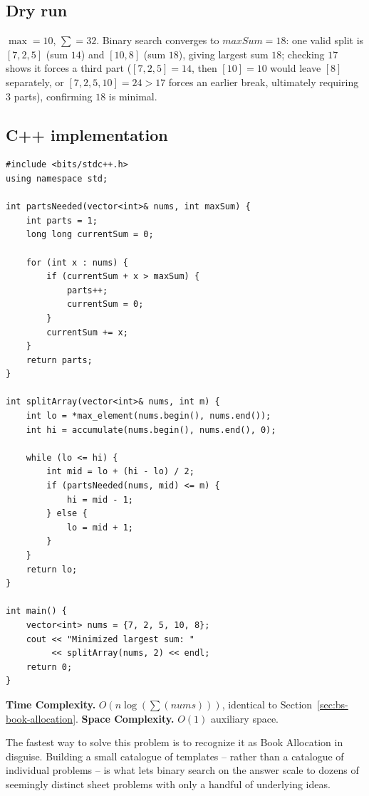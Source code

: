 \subsection*{Dry run}


$\max=10$, $\sum=32$. Binary search converges to $\textit{maxSum}=18$: one
valid split is $[7,2,5]$ (sum $14$) and $[10,8]$ (sum $18$), giving largest
sum $18$; checking $17$ shows it forces a third part
($[7,2,5]=14$, then $[10]=10$ would leave $[8]$ separately, or
$[7,2,5,10]=24>17$ forces an earlier break, ultimately requiring $3$
parts), confirming $18$ is minimal.

\subsection*{C++ implementation}

\begin{lstlisting}
#include <bits/stdc++.h>
using namespace std;

int partsNeeded(vector<int>& nums, int maxSum) {
    int parts = 1;
    long long currentSum = 0;

    for (int x : nums) {
        if (currentSum + x > maxSum) {
            parts++;
            currentSum = 0;
        }
        currentSum += x;
    }
    return parts;
}

int splitArray(vector<int>& nums, int m) {
    int lo = *max_element(nums.begin(), nums.end());
    int hi = accumulate(nums.begin(), nums.end(), 0);

    while (lo <= hi) {
        int mid = lo + (hi - lo) / 2;
        if (partsNeeded(nums, mid) <= m) {
            hi = mid - 1;
        } else {
            lo = mid + 1;
        }
    }
    return lo;
}

int main() {
    vector<int> nums = {7, 2, 5, 10, 8};
    cout << "Minimized largest sum: "
         << splitArray(nums, 2) << endl;
    return 0;
}
\end{lstlisting}

\begin{complexitybox}
\textbf{Time Complexity.}
$O(n \log(\sum(\textit{nums})))$, identical to
Section~\ref{sec:bs-book-allocation}.
\textbf{Space Complexity.} $O(1)$ auxiliary space.
\end{complexitybox}

\begin{takeawaybox}
The fastest way to solve this problem is to recognize it as Book
Allocation in disguise. Building a small catalogue of templates -- rather
than a catalogue of individual problems -- is what lets binary search on
the answer scale to dozens of seemingly distinct sheet problems with only
a handful of underlying ideas.
\end{takeawaybox}
